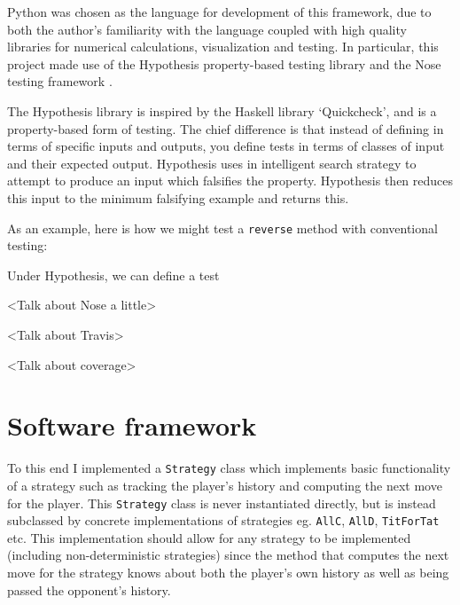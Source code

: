 \documentclass[a4paper,12pt]{article}
\begin{document}
Python was chosen as the language for development of this framework, due to both the author's familiarity with the language coupled with high quality libraries for numerical calculations, visualization and testing.
In particular, this project made use of the Hypothesis property-based testing library \cite{hypothesis} and the Nose testing framework \cite{nose}.

The Hypothesis library is inspired by the Haskell library `Quickcheck', and is a property-based form of testing.
The chief difference is that instead of defining in terms of specific inputs and outputs, you define tests in terms of classes of input and their expected output.
Hypothesis uses in intelligent search strategy to attempt to produce an input which falsifies the property.
Hypothesis then reduces this input to the minimum falsifying example and returns this.

As an example, here is how we might test a \texttt{reverse} method with conventional testing:

Under Hypothesis, we can define a test

<Talk about Nose a little>

<Talk about Travis>

<Talk about coverage>

\section*{Software framework}
To this end I implemented a \texttt{Strategy} class which implements basic functionality of a strategy such as tracking the player's history and computing the next move for the player.
This \texttt{Strategy} class is never instantiated directly, but is instead subclassed by concrete implementations of strategies eg. \texttt{AllC}, \texttt{AllD}, \texttt{TitForTat} etc.
This implementation should allow for any strategy to be implemented (including non-deterministic strategies) since the method that computes the next move for the strategy knows about both the player's own history as well as being passed the opponent's history.
\end{document}
